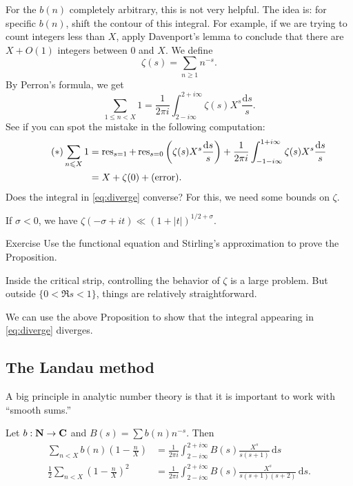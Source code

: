 For the $b(n)$ completely arbitrary, this is not very helpful. The idea is: for 
specific $b(n)$, shift the contour of this integral. For example, if we are 
trying to count integers less than $X$, apply Davenport's lemma to conclude 
that there are $X+O(1)$ integers between $0$ and $X$. We define 
\[
  \zeta(s) = \sum_{n\geqslant 1} n^{-s} .
\]
By Perron's formula, we get 
\[
  \sum_{1\leqslant n<X} 1 = \frac{1}{2\pi i} \int_{2-i\infty}^{2+i\infty} \zeta(s) X^s\frac{\mathrm{d}s}{s} .
\]
See if you can spot the mistake in the following computation: 
\begin{align*}\tag{$\ast$}\label{eq:diverge}
  \sum_{n\leqslant X} 1 
    &= \operatorname{res}_{s=1} + \operatorname{res}_{s=0}\left(\zeta(s)X^s\frac{\mathrm{d}s}{s}\right) + \frac{1}{2\pi i}\int_{-1-i\infty}^{1+i\infty} \zeta(s) X^s\frac{\mathrm{d}s}{s} \\
    &= X+\zeta(0) + (\text{error}) .
\end{align*}
Does the integral in \eqref{eq:diverge} converse? For this, we need some bounds 
on $\zeta$. 

\begin{prop}
If $\sigma<0$, we have $\zeta(-\sigma+i t) \ll (1+|t|)^{1/2+\sigma}$. 
\end{prop}

\begin{enonce}{Exercise}
Use the functional equation and Stirling's approximation to prove the 
Proposition. 
\end{enonce}

Inside the critical strip, controlling the behavior of $\zeta$ is a large 
problem. But outside $\{0<\Re s<1\}$, things are relatively straightforward. 

We can use the above Proposition to show that the integral appearing in 
\eqref{eq:diverge} diverges. 





\subsection{The Landau method}

A big principle in analytic number theory is that it is important to work with 
``smooth sums.'' 

\begin{prop}
Let $b:\mathbf{N}\to \mathbf{C}$ and $B(s)=\sum b(n) n^{-s}$. Then 
\begin{align*}
  \sum_{n<X} b(n)\left(1-\frac n X\right) &= \frac{1}{2\pi i} \int_{2-i\infty}^{2+i\infty} B(s) \frac{X^s}{s(s+1)}\, \mathrm{d}s \\
  \frac 1 2\sum_{n<X}\left(1-\frac n X\right)^2 &= \frac{1}{2\pi i}\int_{2-i\infty}^{2+i\infty} B(s) \frac{X^s}{s(s+1)(s+2)}\, \mathrm{d} s.
\end{align*}
\end{prop}


